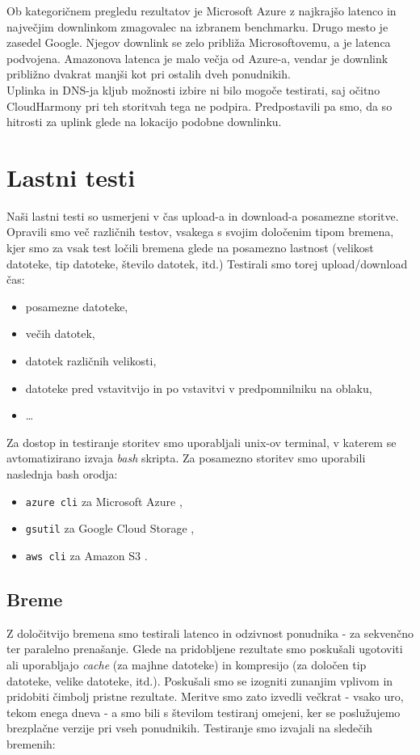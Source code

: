 \documentclass[11pt]{article}
\begin{document}
Ob kategoričnem pregledu rezultatov je Microsoft Azure z najkrajšo latenco in največjim downlinkom zmagovalec na izbranem benchmarku.
Drugo mesto je zasedel Google. Njegov downlink se zelo približa Microsoftovemu, a je latenca podvojena.
Amazonova latenca je malo večja od Azure-a, vendar je downlink približno dvakrat manjši kot pri ostalih dveh ponudnikih.\\

Uplinka in DNS-ja kljub možnosti izbire ni bilo mogoče testirati, saj očitno CloudHarmony pri teh storitvah tega ne podpira. Predpostavili pa smo, da so hitrosti za uplink glede na lokacijo podobne downlinku.

\section{Lastni testi} \label{lastni_testi}
Naši lastni testi so usmerjeni v čas upload-a in download-a posamezne storitve. Opravili smo več različnih testov, vsakega s svojim določenim tipom bremena, kjer smo za vsak test ločili bremena glede na posamezno lastnost (velikost datoteke, tip datoteke, število datotek, itd.)
\newline
Testirali smo torej upload/download čas:
\begin{itemize}
    \item posamezne datoteke,
    \item večih datotek,
    \item datotek različnih velikosti,
    \item datoteke pred vstavitvijo in po vstavitvi v predpomnilniku na oblaku,
    \item \ldots
\end{itemize}
Za dostop in testiranje storitev smo uporabljali unix-ov terminal, v katerem se avtomatizirano izvaja \textit{bash} skripta.
\newline
Za posamezno storitev smo uporabili naslednja bash orodja:
\begin{itemize}
    \item \texttt{azure cli} za Microsoft Azure \cite{azure_cli},
    \item \texttt{gsutil} za Google Cloud Storage \cite{gsutil},
    \item \texttt{aws cli} za Amazon S3 \cite{aws_cli}.
\end{itemize}


\subsection{Breme}
Z določitvijo bremena smo testirali latenco in odzivnost ponudnika - za sekvenčno ter paralelno prenašanje. Glede na pridobljene rezultate smo poskušali ugotoviti ali uporabljajo \textit{cache} (za majhne datoteke) in kompresijo (za določen tip datoteke, velike datoteke, itd.). Poskušali smo se izogniti zunanjim vplivom in pridobiti čimbolj pristne rezultate. Meritve smo zato izvedli večkrat - vsako uro, tekom enega dneva - a smo bili s številom testiranj omejeni, ker se poslužujemo brezplačne verzije pri vseh ponudnikih. 
Testiranje smo izvajali na sledečih bremenih:
\end{document}
